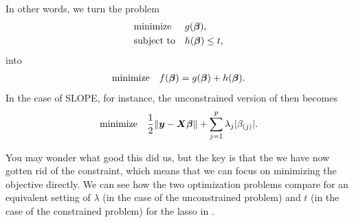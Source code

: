 In other words, we turn the problem
\[
  \begin{aligned}
     & \text{minimize}   &  & g(\boldsymbol{\beta}),       \\
     & \text{subject to} &  & h(\boldsymbol{\beta})\leq t,
  \end{aligned}
\]
into
\[
  \begin{aligned}
    \text{minimize} &  & f(\boldsymbol{\beta}) = g(\boldsymbol{\beta}) + h(\boldsymbol{\beta}).
  \end{aligned}
\]
In the case of SLOPE, for instance, the unconstrained version of  then becomes
\[
  \begin{aligned}
    \text{minimize} &  & \frac{1}{2} \lVert \boldsymbol{y} - \boldsymbol{X}\boldsymbol{\beta}\rVert + \sum_{j=1}^p \lambda_j |\beta_{(j)}|.
  \end{aligned}
\]

You may wonder what good this did us, but the key is that the we have now gotten rid of the constraint, which means that we can focus on minimizing the objective directly. We can see how the two optimization problems compare for an equivalent setting of \(\lambda\) (in the case of the unconstrained problem) and \(t\) (in the case of the constrained problem) for the lasso in .

